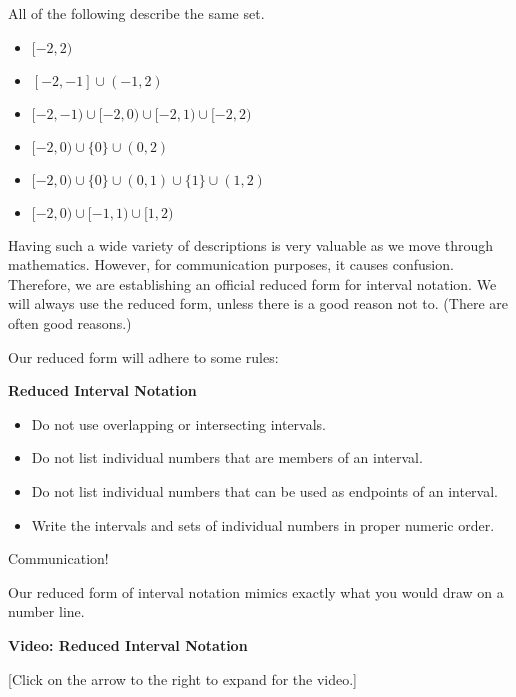 \documentclass{ximera}
\begin{document}
All of the following describe the same set.

\begin{itemize}
\item $[-2, 2)$
\item $[-2, -1] \cup (-1, 2)$
\item $[-2, -1) \cup [-2, 0) \cup [-2, 1) \cup [-2, 2)$
\item $[-2, 0) \cup \{ 0 \} \cup (0, 2)$
\item $[-2, 0) \cup \{ 0 \} \cup (0, 1) \cup \{ 1 \} \cup (1, 2)$
\item $[-2, 0) \cup [-1, 1) \cup [1, 2)$
\end{itemize}

Having such a wide variety of descriptions is very valuable as we move through mathematics.  However, for communication purposes, it causes confusion. Therefore, we are establishing an official reduced form for interval notation.  We will always use the reduced form, unless there is a good reason not to.  (There are often good reasons.)

Our reduced form will adhere to some rules:





\begin{notation} \textbf{\textcolor{blue!75!black}{Reduced Interval Notation}} \\

\begin{itemize}
\item Do not use overlapping or intersecting intervals.
\item Do not list individual numbers that are members of an interval.
\item Do not list individual numbers that can be used as endpoints of an interval.
\item Write the intervals and sets of individual numbers in proper numeric order.
\end{itemize}

\end{notation}
Communication!

Our reduced form of interval notation mimics exactly what you would draw on a number line.







\begin{explanation} \textbf{Video: Reduced Interval Notation}

[Click on the arrow to the right to expand for the video.]
\begin{expandable} 

\begin{center}
\end{center}

\end{expandable}
\end{explanation}
\end{document}
